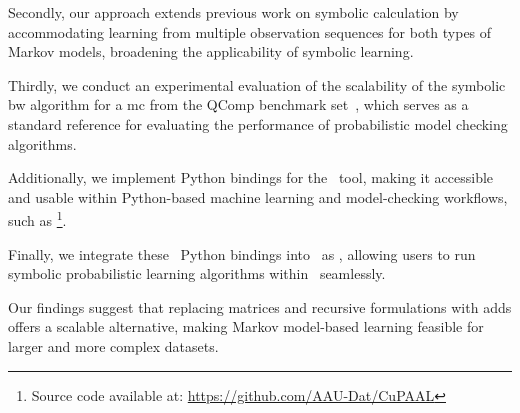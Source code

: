Secondly, our approach extends previous work on symbolic calculation by accommodating learning from multiple observation sequences for both types of Markov models, broadening the applicability of symbolic learning.

Thirdly, we conduct an experimental evaluation of the scalability of the symbolic \gls{bw} algorithm for a \gls{mc} from the QComp benchmark set~\cite{hartmanns2019quantitative}, which serves as a standard reference for evaluating the performance of probabilistic model checking algorithms.

Additionally, we implement Python bindings for the \Cupaal\ tool, making it accessible and usable within Python-based machine learning and model-checking workflows, such as \Jajapy\footnote{Source code available at: \url{https://github.com/AAU-Dat/CuPAAL}}.

Finally, we integrate these \Cupaal\ Python bindings into \Jajapy\ as \JajapyTwo, allowing users to run symbolic probabilistic learning algorithms within \Jajapy\ seamlessly.

Our findings suggest that replacing matrices and recursive formulations with \glspl{add} offers a scalable alternative, making Markov model-based learning feasible for larger and more complex datasets.